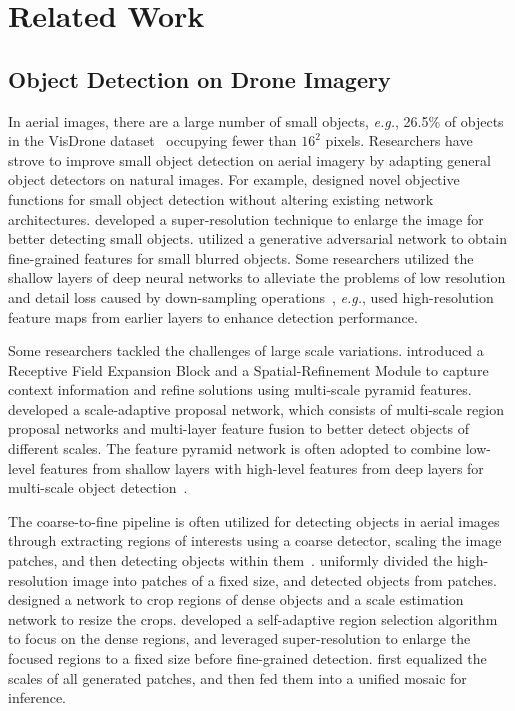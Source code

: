 \documentclass[letterpaper]{article} %
\def \eg {\emph{e.g.}}
\begin{document}
\section{Related Work}
\label{sec: related-work}
\subsection{Object Detection on Drone Imagery}
In aerial images, there are a large number of small objects, \eg, 26.5\% of objects in the VisDrone dataset~\cite{Zhu_2022_VisDrone} occupying fewer than $16^2$ pixels. Researchers have strove to improve small object detection on aerial imagery by adapting general object detectors on natural images. For example, \citet{Cheng_2019_Learning} designed novel objective functions for small object detection without altering existing network architectures. \citet{Li_2017_Perceptual} developed a super-resolution technique to enlarge the image for better detecting small objects. \citet{Bai_2018_SODMTGAN} utilized a generative adversarial network to obtain fine-grained features for small blurred objects. Some researchers utilized the shallow layers of deep neural networks to alleviate the problems of low resolution and detail loss caused by down-sampling operations~\cite{Bouguettaya_2022_review}, \eg, \citet{Sommer_2017_Fast} used high-resolution feature maps from earlier layers to enhance detection performance. 

Some researchers tackled the challenges of large scale variations. \citet{Wang_2019_Spatial} introduced a Receptive Field Expansion Block and a Spatial-Refinement Module to capture context information and refine solutions using multi-scale pyramid features. \citet{Zhang_2019_Scale} developed a scale-adaptive proposal network, which consists of multi-scale region proposal networks and multi-layer feature fusion to better detect objects of different scales. The feature pyramid network is often adopted to combine low-level features from shallow layers with high-level features from deep layers for multi-scale object detection~\cite{Zhou_2019_SAICFPN}. 


The coarse-to-fine pipeline is often utilized for detecting objects in aerial images through extracting regions of interests using a coarse detector, scaling the image patches, and then detecting objects within them~\cite{Bouguettaya_2022_review}. \citet{Unel_2019_TilingSOD} uniformly divided the high-resolution image into patches of a fixed size, and detected objects from patches. \citet{Yang_2019_Clustered} designed a network to crop regions of dense objects and a scale estimation network to resize the crops. \citet{Xu_2022_AdaZoom} developed a self-adaptive region selection algorithm to focus on the dense regions, and leveraged super-resolution to enlarge the focused regions to a fixed size before fine-grained detection. \citet{Huang_2022_UFPMP} first equalized the scales of all generated patches, and then fed them into a unified mosaic for inference. 
\end{document}
